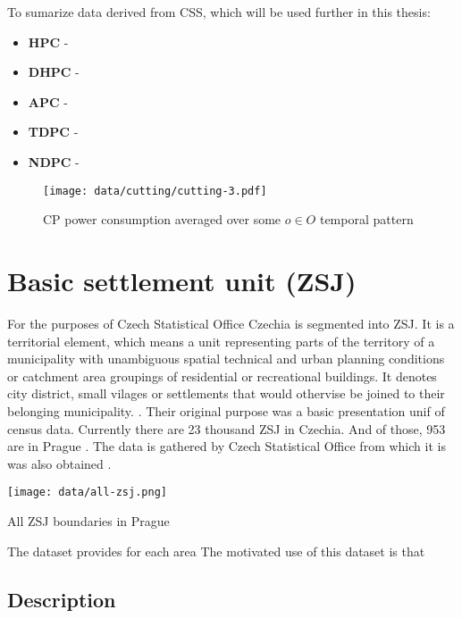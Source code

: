 To sumarize data derived from \acrlong{CSS}, which will be used further in this thesis:
\begin{itemize}
    \item \textbf{\acrlong{HPC}} - \lipsum[1][1-3]
    \item \textbf{\acrlong{DHPC}} - \lipsum[1][1-3]
    \item \textbf{\acrlong{APC}} - \lipsum[1][1-3]
    \item \textbf{\acrlong{TDPC}} - \lipsum[1][1-3]
    \item \textbf{\acrlong{NDPC}} - \lipsum[1][1-3]
\end{itemize}

\begin{figure}
    \texttt{[image: data/cutting/cutting-3.pdf]}
    \caption[Cutting]{\acrlong{CP} power consumption averaged over some $o \in O$ temporal pattern}
\end{figure}

\section{Basic settlement unit (ZSJ)}


For the purposes of Czech Statistical Office Czechia is segmented into \acrfull{ZSJ}. It is a territorial element, which means a unit representing parts of the territory of a municipality with unambiguous spatial technical and urban planning conditions or catchment area groupings of residential or recreational buildings. It denotes city district, small vilages or settlements that would othervise be joined to their belonging municipality. . Their original purpose was a basic presentation unif of census data. Currently there are 23 thousand \acrshort{ZSJ} in Czechia. And of those, 953 are in Prague . The data is gathered by Czech Statistical Office from which it is was also obtained .

\begin{marginfigure}
    \texttt{[image: data/all-zsj.png]}
    \caption{}{All \acrlong{ZSJ} boundaries in Prague}
\end{marginfigure}


The dataset provides for each area
The motivated use of this dataset is that

\subsection{Description}

